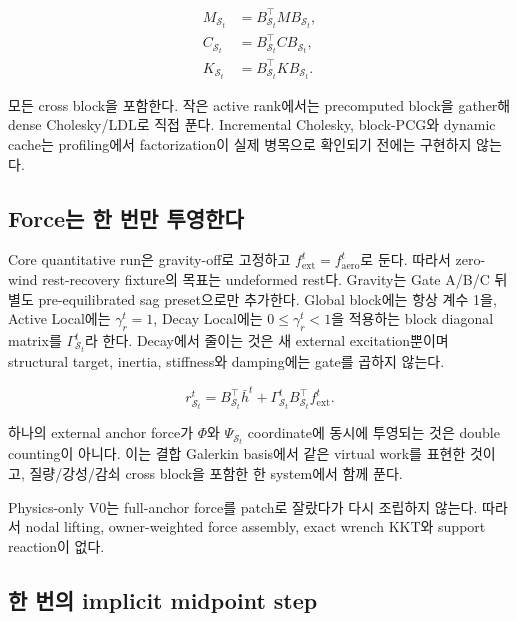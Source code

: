 \documentclass[11pt]{article}
\begin{document}
\begin{equation}
\begin{aligned}
  M_{\mathcal S_t}&=B_{\mathcal S_t}^\top MB_{\mathcal S_t},\\
  C_{\mathcal S_t}&=B_{\mathcal S_t}^\top CB_{\mathcal S_t},\\
  K_{\mathcal S_t}&=B_{\mathcal S_t}^\top KB_{\mathcal S_t}.
\end{aligned}
  \label{eq:minimal-coupled-blocks}
\end{equation}

모든 cross block을 포함한다. 작은 active rank에서는 precomputed block을 gather해
dense Cholesky/LDL로 직접 푼다. Incremental Cholesky, block-PCG와 dynamic cache는
profiling에서 factorization이 실제 병목으로 확인되기 전에는 구현하지 않는다.

\subsection{Force는 한 번만 투영한다}

Core quantitative run은 gravity-off로 고정하고 \(f_{\mathrm{ext}}^t=f_{\mathrm{aero}}^t\)로 둔다.
따라서 zero-wind rest-recovery fixture의 목표는 undeformed rest다.
Gravity는 Gate A/B/C 뒤 별도 pre-equilibrated sag preset으로만 추가한다.
Global block에는 항상 계수 1을, Active Local에는 \(\gamma_r^t=1\),
Decay Local에는 \(0\leq\gamma_r^t<1\)을 적용하는 block diagonal matrix를
\(\Gamma_{\mathcal S_t}^t\)라 한다. Decay에서 줄이는 것은 새 external excitation뿐이며
structural target, inertia, stiffness와 damping에는 gate를 곱하지 않는다.

\begin{equation}
  r_{\mathcal S_t}^t
  =
  B_{\mathcal S_t}^\top\bar h^t
  +\Gamma_{\mathcal S_t}^t
  B_{\mathcal S_t}^\top f_{\mathrm{ext}}^t.
  \label{eq:minimal-direct-load}
\end{equation}

하나의 external anchor force가 \(\Phi\)와 \(\Psi_{\mathcal S_t}\) coordinate에 동시에 투영되는 것은
double counting이 아니다. 이는 결합 Galerkin basis에서 같은 virtual work를 표현한 것이고,
질량/강성/감쇠 cross block을 포함한 한 system에서 함께 푼다.

Physics-only V0는 full-anchor force를 patch로 잘랐다가 다시 조립하지 않는다.
따라서 nodal lifting, owner-weighted force assembly, exact wrench KKT와 support reaction이 없다.

\subsection{한 번의 implicit midpoint step}
\end{document}
